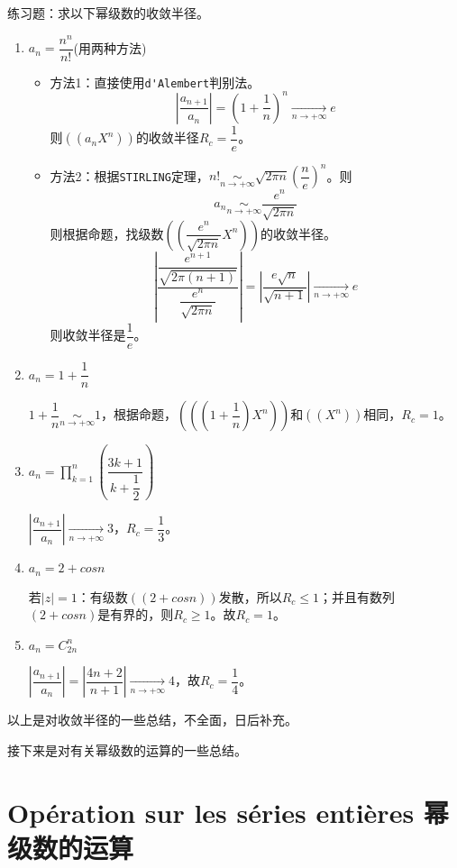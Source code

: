 \documentclass[math_note.tex]{subfiles}
\begin{document}
\newpage
练习题：求以下幂级数的收敛半径。
\begin{enumerate}
	\item $a_{n}=\dfrac{n^{n}}{n!}$(用两种方法)
	\begin{itemize}
		\item 方法1：直接使用\verb|d'Alembert|判别法。
		$$|\dfrac{a_{n+1}}{a_{n}}| = (1+\dfrac{1}{n})^{n} \underset{n \rightarrow +\infty}
		{\rightarrow} e$$
		则$((a_{n}X^{n}))$的收敛半径$R_{c}=\dfrac{1}{e}$。
		\item 方法2：根据\verb|STIRLING|定理，$n!\underset{n \rightarrow +\infty}{\sim} 
		\sqrt{2\pi n}(\dfrac{n}{e})^{n}$。则
		$$a_{n} \underset{n \rightarrow +\infty}{\sim} \dfrac{e^{n}}{\sqrt{2 \pi n}} $$
		则根据命题，找级数$ ((\dfrac{e^{n}}{\sqrt{2 \pi n}} X^{n})) $的收敛半径。
		$$ |\dfrac{\dfrac{e^{n+1}}{\sqrt{2 \pi (n+1)}}}{\dfrac{e^{n}}{\sqrt{2 \pi n}}}| 
		= |\dfrac{e\sqrt{n}}{\sqrt{n+1}}| \underset{ n \rightarrow +\infty}{\rightarrow}
		e$$
		则收敛半径是$\dfrac{1}{e}$。
	\end{itemize}
	
	\item $a_{n}=1+\dfrac{1}{n}$

	$1+\dfrac{1}{n} \underset{n \rightarrow +\infty}{\sim} 1$，根据命题，$(((1+\dfrac{1}{n}) 
	X^{n}))$和$((X^{n}))$相同，$R_{c}=1$。

	\item $a_{n}= \prod\limits_{k=1}^{n}(\dfrac{3k+1}{k+\dfrac{1}{2}})$

	$|\dfrac{a_{n+1}}{a_{n}}| \underset{n\rightarrow+\infty}{\rightarrow} 3$，$R_{c}=\dfrac{1}{3}$。

	\item $a_{n}=2+cos n$

	若$|z|=1$：有级数$((2+cosn))$发散，所以$R_{c}\leq 1$；并且有数列$(2+cosn)$是有界的，则$R_{c}
	 \geq 1 $。故$R_{c} = 1$。

	\item $a_{n}=C_{2n}^{n}$
    
    $|\dfrac{a_{n+1}}{a_{n}}|=|\dfrac{4n+2}{n+1}| \underset{n \rightarrow +\infty}{\rightarrow}
     4$，故$R_{c}=\dfrac{1}{4}$。

		
\end{enumerate}

以上是对收敛半径的一些总结，不全面，日后补充。

接下来是对有关幂级数的运算的一些总结。

\section{Opération sur les séries entières 幂级数的运算}
\end{document}
